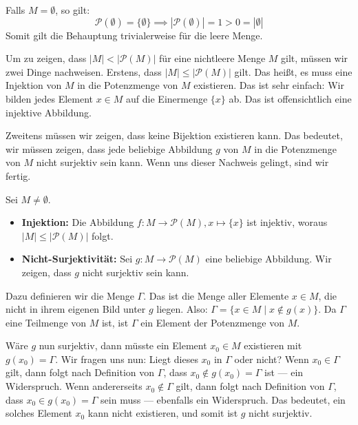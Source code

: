 \begin{math-stroke}
\begin{short-proof}[Beweis von \cref{thm:cantor} für $M = \emptyset$]
Falls $M = \emptyset$, so gilt:
\[
\mathcal{P}(\emptyset) = \{\emptyset\} \implies |\mathcal{P}(\emptyset)| = 1 > 0 = |\emptyset|
\]
Somit gilt die Behauptung trivialerweise für die leere Menge.
\end{short-proof}
\end{math-stroke}

\begin{spoken-clean}[01:00:55 - 01:02:29]
Um zu zeigen, dass $|M| < |\mathcal{P}(M)|$ für eine nichtleere Menge $M$ gilt, müssen wir zwei Dinge nachweisen. Erstens, dass $|M| \le |\mathcal{P}(M)|$ gilt. Das heißt, es muss eine Injektion von $M$ in die Potenzmenge von $M$ existieren. Das ist sehr einfach: Wir bilden jedes Element $x \in M$ auf die Einermenge $\{x\}$ ab. Das ist offensichtlich eine injektive Abbildung.

Zweitens müssen wir zeigen, dass keine Bijektion existieren kann. Das bedeutet, wir müssen zeigen, dass jede beliebige Abbildung $g$ von $M$ in die Potenzmenge von $M$ nicht surjektiv sein kann. Wenn uns dieser Nachweis gelingt, sind wir fertig.
\end{spoken-clean}

\begin{math-stroke}
Sei $M \neq \emptyset$.
\begin{itemize}
    \item \textbf{Injektion:} Die Abbildung $f \colon M \to \mathcal{P}(M), x \mapsto \{x\}$ ist injektiv, woraus $|M| \le |\mathcal{P}(M)|$ folgt.
    \item \textbf{Nicht-Surjektivität:} Sei $g \colon M \to \mathcal{P}(M)$ eine beliebige Abbildung. Wir zeigen, dass $g$ nicht surjektiv sein kann.
\end{itemize}
\end{math-stroke}

\begin{spoken-clean}[01:02:29 - 01:03:23]
Dazu definieren wir die Menge $\Gamma$. Das ist die Menge aller Elemente $x \in M$, die nicht in ihrem eigenen Bild unter $g$ liegen. Also: $\Gamma = \{ x \in M \mid x \notin g(x) \}$. Da $\Gamma$ eine Teilmenge von $M$ ist, ist $\Gamma$ ein Element der Potenzmenge von $M$.

Wäre $g$ nun surjektiv, dann müsste ein Element $x_0 \in M$ existieren mit $g(x_0) = \Gamma$. Wir fragen uns nun: Liegt dieses $x_0$ in $\Gamma$ oder nicht? Wenn $x_0 \in \Gamma$ gilt, dann folgt nach Definition von $\Gamma$, dass $x_0 \notin g(x_0) = \Gamma$ ist --- ein Widerspruch. Wenn andererseits $x_0 \notin \Gamma$ gilt, dann folgt nach Definition von $\Gamma$, dass $x_0 \in g(x_0) = \Gamma$ sein muss --- ebenfalls ein Widerspruch. Das bedeutet, ein solches Element $x_0$ kann nicht existieren, und somit ist $g$ nicht surjektiv.
\end{spoken-clean}

